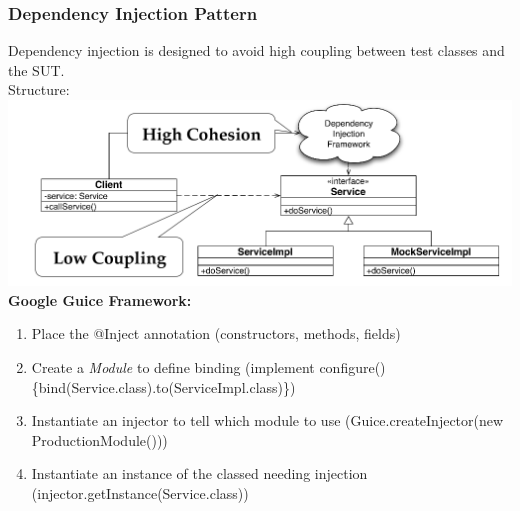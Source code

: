 \subsubsection{Dependency Injection Pattern}
Dependency injection is designed to avoid high coupling between test classes and the SUT.\\
Structure:\\
\includegraphics[width=\linewidth]{images/testing_pattern_dependency_injection.png}\\
\textbf{Google Guice Framework:}
\begin{enumerate}
  \item Place the @Inject annotation (constructors, methods, fields)
  \item Create a \textit{Module} to define binding (implement configure()\{bind(Service.class).to(ServiceImpl.class)\})
  \item Instantiate an injector to tell which module to use (Guice.createInjector(new ProductionModule()))
  \item Instantiate an instance of the classed needing injection (injector.getInstance(Service.class))
\end{enumerate}
\newpage
